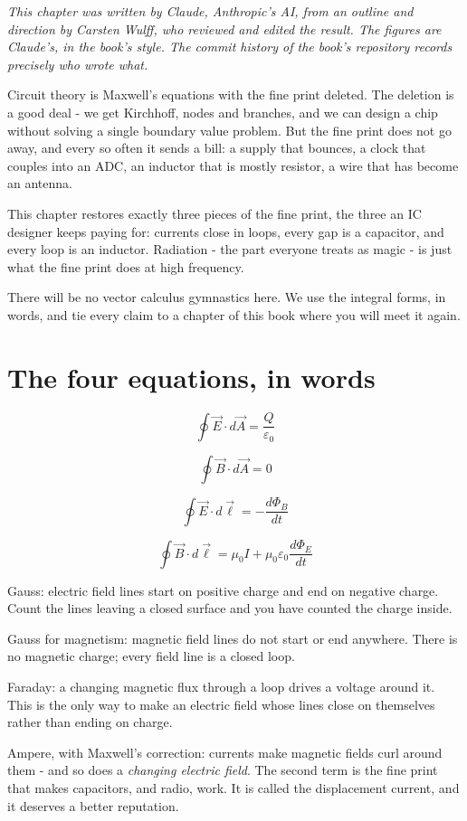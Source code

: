 \emph{This chapter was written by Claude, Anthropic's AI, from an
outline and direction by Carsten Wulff, who reviewed and edited the
result. The figures are Claude's, in the book's style. The commit
history of the book's repository records precisely who wrote what.}

Circuit theory is Maxwell's equations with the fine print deleted. The
deletion is a good deal - we get Kirchhoff, nodes and branches, and we
can design a chip without solving a single boundary value problem. But
the fine print does not go away, and every so often it sends a bill: a
supply that bounces, a clock that couples into an ADC, an inductor that
is mostly resistor, a wire that has become an antenna.

This chapter restores exactly three pieces of the fine print, the three
an IC designer keeps paying for: currents close in loops, every gap is a
capacitor, and every loop is an inductor. Radiation - the part everyone
treats as magic - is just what the fine print does at high frequency.

There will be no vector calculus gymnastics here. We use the integral
forms, in words, and tie every claim to a chapter of this book where you
will meet it again.

\section{The four equations, in
words}\label{the-four-equations-in-words}

\[ \oint \vec{E} \cdot d\vec{A} = \frac{Q}{\varepsilon_0} \]

\[ \oint \vec{B} \cdot d\vec{A} = 0 \]

\[ \oint \vec{E} \cdot d\vec{\ell} = -\frac{d\Phi_B}{dt} \]

\[ \oint \vec{B} \cdot d\vec{\ell} = \mu_0 I + \mu_0 \varepsilon_0 \frac{d\Phi_E}{dt} \]

Gauss: electric field lines start on positive charge and end on negative
charge. Count the lines leaving a closed surface and you have counted
the charge inside.

Gauss for magnetism: magnetic field lines do not start or end anywhere.
There is no magnetic charge; every field line is a closed loop.

Faraday: a changing magnetic flux through a loop drives a voltage around
it. This is the only way to make an electric field whose lines close on
themselves rather than ending on charge.

Ampere, with Maxwell's correction: currents make magnetic fields curl
around them - and so does a \emph{changing electric field}. The second
term is the fine print that makes capacitors, and radio, work. It is
called the displacement current, and it deserves a better reputation.

